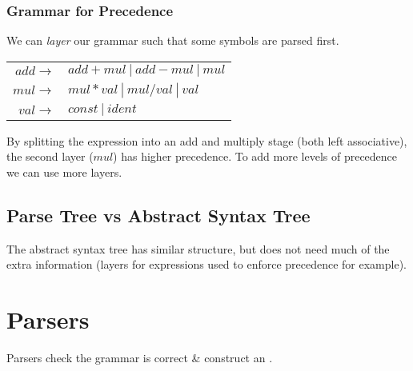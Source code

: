 \documentclass{report}
\begin{document}
            \subsubsection*{Grammar for Precedence}
                We can \textit{layer} our grammar such that some symbols are parsed first.
                \begin{center}
                    \begin{tabular}{r l }
                        $add \to$ & $ add + mul \ | \ add - mul \ | \ mul$ \\
                        $mul \to$ & $mul * val \ | \ mul / val \ | \ val$ \\
                        $val \to$ & $const \ | \ ident$ \\
                    \end{tabular}
                \end{center}
                By splitting the expression into an add and multiply stage (both left associative), the second layer ($mul$) has higher precedence. To add more levels of precedence we can use more layers.

        \subsection*{Parse Tree vs Abstract Syntax Tree}
            The abstract syntax tree has similar structure, but does not need much of the extra information (layers for expressions used to enforce precedence for example).
    
    \section*{Parsers}
        Parsers check the grammar is correct \& construct an .

\end{document}
